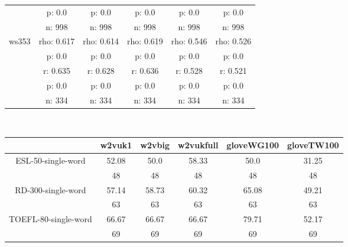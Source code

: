 \documentclass{article}
\begin{document}
\begin{tabular}{cccccc|}
\multicolumn{1}{|c|}{} & p: 0.0 & p: 0.0 & p: 0.0 & p: 0.0 & p: 0.0 \\
\multicolumn{1}{|c|}{} & n: 998 & n: 998 & n: 998 & n: 998 & n: 998 \\
\hline
\multicolumn{1}{|c|}{\multirow{5}{*}{ws353}} & rho: 0.617 & rho: 0.614 & rho: 0.619 & rho: 0.546 & rho: 0.526 \\
\multicolumn{1}{|c|}{} & p: 0.0 & p: 0.0 & p: 0.0 & p: 0.0 & p: 0.0 \\
\multicolumn{1}{|c|}{} & r: 0.635 & r: 0.628 & r: 0.636 & r: 0.528 & r: 0.521 \\
\multicolumn{1}{|c|}{} & p: 0.0 & p: 0.0 & p: 0.0 & p: 0.0 & p: 0.0 \\
\multicolumn{1}{|c|}{} & n: 334 & n: 334 & n: 334 & n: 334 & n: 334 \\
\hline
\end{tabular}\\
\begin{tabular}{cccccc|}\cline{2-6}
&\multicolumn{1}{|c}{w2vuk1} & w2vbig & w2vukfull & gloveWG100 & gloveTW100 \\\hline
\multicolumn{1}{|c|}{\multirow{2}{*}{ESL-50-single-word}} & 52.08 & 50.0 & 58.33 & 50.0 & 31.25 \\
\multicolumn{1}{|c|}{} & 48 & 48 & 48 & 48 & 48 \\
\hline
\multicolumn{1}{|c|}{\multirow{2}{*}{RD-300-single-word}} & 57.14 & 58.73 & 60.32 & 65.08 & 49.21 \\
\multicolumn{1}{|c|}{} & 63 & 63 & 63 & 63 & 63 \\
\hline
\multicolumn{1}{|c|}{\multirow{2}{*}{TOEFL-80-single-word}} & 66.67 & 66.67 & 66.67 & 79.71 & 52.17 \\
\multicolumn{1}{|c|}{} & 69 & 69 & 69 & 69 & 69 \\
\hline
\end{tabular}\\
\end{document}
